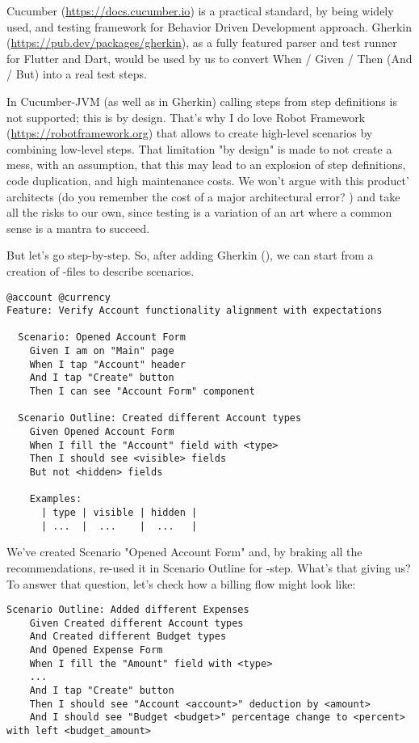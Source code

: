 Cucumber (\href{https://docs.cucumber.io}{https://docs.cucumber.io}) is a practical standard, by being widely used, 
and testing framework for Behavior Driven Development approach. Gherkin 
(\href{https://pub.dev/packages/gherkin}{https://pub.dev/packages/gherkin}), as a fully featured parser and 
test runner for Flutter and Dart, would be used by us to convert When / Given / Then (And / But) into a real test steps.

In Cucumber-JVM (as well as in Gherkin) calling steps from step definitions is not supported; this is by design. That's
why I do love Robot Framework (\href{https://robotframework.org}{https://robotframework.org}) that allows to create 
high-level scenarios by combining low-level steps. That limitation "by design" is made to not create a mess, with an 
assumption, that this may lead to an explosion of step definitions, code duplication, and high maintenance costs. We 
won't argue with this product' architects (do you remember the cost of a major architectural error? \cite{Sanket19}) 
and take all the risks to our own, since testing is a variation of an art where a common sense is a mantra to succeed.

But let's go step-by-step. So, after adding Gherkin (), we can start from a
creation of -files to describe scenarios.

\begin{lstlisting}[language=cucumber]
@account @currency
Feature: Verify Account functionality alignment with expectations

  Scenario: Opened Account Form
    Given I am on "Main" page
    When I tap "Account" header
    And I tap "Create" button
    Then I can see "Account Form" component

  Scenario Outline: Created different Account types
    Given Opened Account Form
    When I fill the "Account" field with <type>
    Then I should see <visible> fields
    But not <hidden> fields

    Examples: 
      | type | visible | hidden |
      | ...  |  ...    |  ...   |
\end{lstlisting}

We've created Scenario "Opened Account Form" and, by braking all the recommendations, re-used it in Scenario Outline 
for -step. What's that giving us? To answer that question, let's check how a billing flow might look like:

\begin{lstlisting}[language=cucumber]
  Scenario Outline: Added different Expenses
    Given Created different Account types
    And Created different Budget types
    And Opened Expense Form
    When I fill the "Amount" field with <type>
    ...
    And I tap "Create" button
    Then I should see "Account <account>" deduction by <amount>
    And I should see "Budget <budget>" percentage change to <percent> with left <budget_amount>
\end{lstlisting}

